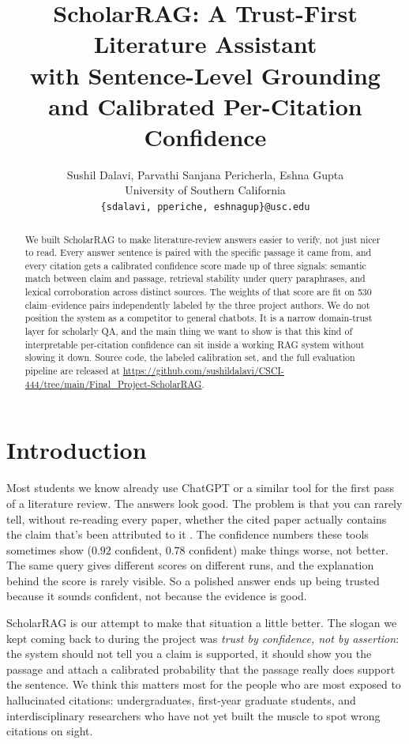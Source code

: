 \documentclass[10pt]{article}
\title{ScholarRAG: A Trust-First Literature Assistant\\
with Sentence-Level Grounding and Calibrated Per-Citation Confidence}
\author{
Sushil Dalavi, Parvathi Sanjana Pericherla, Eshna Gupta \\
University of Southern California \\
\texttt{\{sdalavi, pperiche, eshnagup\}@usc.edu}
}
\begin{document}
\maketitle

\begin{abstract}
We built ScholarRAG to make literature-review answers easier to
verify, not just nicer to read. Every answer sentence is paired with
the specific passage it came from, and every citation gets a
calibrated confidence score made up of three signals: semantic match
between claim and passage, retrieval stability under query
paraphrases, and lexical corroboration across distinct sources. The
weights of that score are fit on 530 claim--evidence pairs
independently labeled by the three project authors. We do not
position the system as a competitor to general chatbots. It is a
narrow domain-trust layer for scholarly QA, and the main thing we
want to show is that this kind of interpretable per-citation
confidence can sit inside a working RAG system without slowing it
down. Source code, the labeled calibration set, and the full
evaluation pipeline are released
at \url{https://github.com/sushildalavi/CSCI-444/tree/main/Final_Project-ScholarRAG}.
\end{abstract}

\section{Introduction}
\label{sec:intro}

Most students we know already use ChatGPT or a similar tool for the
first pass of a literature review. The answers look good. The
problem is that you can rarely tell, without re-reading every paper,
whether the cited paper actually contains the claim that's been
attributed to it \citep{maynez2020faithfulness, rashkin2023attribution}.
The confidence numbers these tools sometimes show ($0.92$ confident,
$0.78$ confident) make things worse, not better. The same query gives
different scores on different runs, and the explanation behind the
score is rarely visible. So a polished answer ends up being trusted
because it sounds confident, not because the evidence is good.

ScholarRAG is our attempt to make that situation a little better. The
slogan we kept coming back to during the project was \emph{trust by
confidence, not by assertion}: the system should not tell you a claim
is supported, it should show you the passage and attach a calibrated
probability that the passage really does support the sentence. We
think this matters most for the people who are most exposed to
hallucinated citations: undergraduates, first-year graduate students,
and interdisciplinary researchers who have not yet built the muscle
to spot wrong citations on sight.
\end{document}
